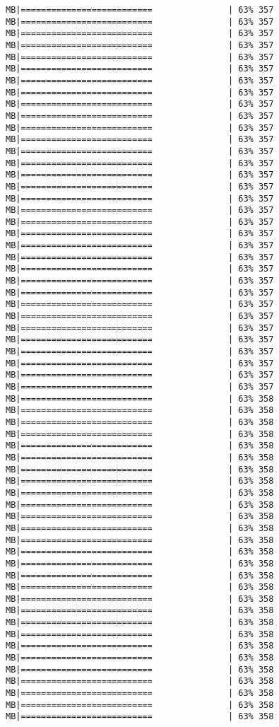 \documentclass[
]{article}
\begin{document}
\begin{verbatim}
MB|==========================               | 63% 357 MB|==========================               | 63% 357 MB|==========================               | 63% 357 MB|==========================               | 63% 357 MB|==========================               | 63% 357 MB|==========================               | 63% 357 MB|==========================               | 63% 357 MB|==========================               | 63% 357 MB|==========================               | 63% 357 MB|==========================               | 63% 357 MB|==========================               | 63% 357 MB|==========================               | 63% 357 MB|==========================               | 63% 357 MB|==========================               | 63% 357 MB|==========================               | 63% 357 MB|==========================               | 63% 357 MB|==========================               | 63% 357 MB|==========================               | 63% 357 MB|==========================               | 63% 357 MB|==========================               | 63% 357 MB|==========================               | 63% 357 MB|==========================               | 63% 357 MB|==========================               | 63% 357 MB|==========================               | 63% 357 MB|==========================               | 63% 357 MB|==========================               | 63% 357 MB|==========================               | 63% 357 MB|==========================               | 63% 357 MB|==========================               | 63% 357 MB|==========================               | 63% 357 MB|==========================               | 63% 357 MB|==========================               | 63% 357 MB|==========================               | 63% 357 MB|==========================               | 63% 358 MB|==========================               | 63% 358 MB|==========================               | 63% 358 MB|==========================               | 63% 358 MB|==========================               | 63% 358 MB|==========================               | 63% 358 MB|==========================               | 63% 358 MB|==========================               | 63% 358 MB|==========================               | 63% 358 MB|==========================               | 63% 358 MB|==========================               | 63% 358 MB|==========================               | 63% 358 MB|==========================               | 63% 358 MB|==========================               | 63% 358 MB|==========================               | 63% 358 MB|==========================               | 63% 358 MB|==========================               | 63% 358 MB|==========================               | 63% 358 MB|==========================               | 63% 358 MB|==========================               | 63% 358 MB|==========================               | 63% 358 MB|==========================               | 63% 358 MB|==========================               | 63% 358 MB|==========================               | 63% 358 MB|==========================               | 63% 358 MB|==========================               | 63% 358 MB|==========================               | 63% 358 MB|==========================               | 63% 358 
\end{verbatim}
\end{document}
